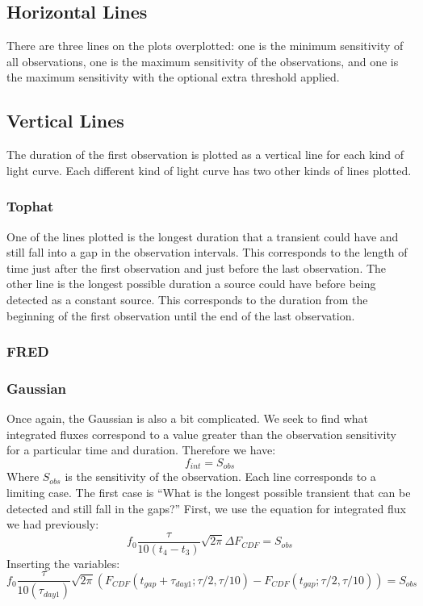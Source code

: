 \documentclass{article}
\begin{document}
\subsection{Horizontal Lines}
There are three lines on the plots overplotted: one is the minimum sensitivity of all observations, one is the maximum sensitivity of the observations, and one is the maximum sensitivity with the optional extra threshold applied.

\subsection{Vertical Lines}
The duration of the first observation is plotted as a vertical line for each kind of light curve. Each different kind of light curve has two other kinds of lines plotted.

\subsubsection{Tophat}
One of the lines plotted is the longest duration that a transient could have and still fall into a gap in the observation intervals. This corresponds to the length of time just after the first observation and just before the last observation. The other line is the longest possible duration a source could have before being detected as a constant source. This corresponds to the duration from the beginning of the first observation until the end of the last observation.

\subsubsection{FRED}

\subsubsection{Gaussian}
Once again, the Gaussian is also a bit complicated. We seek to find what integrated fluxes correspond to a value greater than the observation sensitivity for a particular time and duration. Therefore we have:
\[f_{int} = S_{obs}\]
Where $S_{obs}$ is the sensitivity of the observation. Each line corresponds to a limiting case. The first case is ``What is the longest possible transient that can be detected and still fall in the gaps?'' First, we use the equation for integrated flux we had previously:
\[f_0 \frac{\tau}{10(t_4-t_3)}\sqrt{2\pi}\Delta F_{CDF} =  S_{obs}\]
Inserting the variables:
\[f_0 \frac{\tau}{10(\tau_{day1})}\sqrt{2\pi}(F_{CDF}(t_{gap} + \tau_{day1}; \tau/2,\tau/10) -F_{CDF}(t_{gap}; \tau/2, \tau/10)) =  S_{obs}\]
\end{document}
